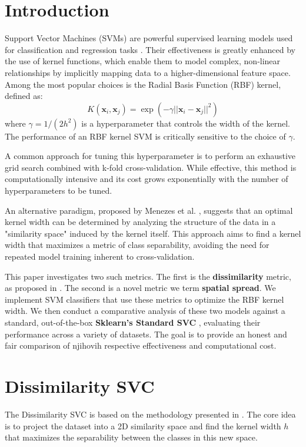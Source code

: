 \documentclass[conference]{IEEEtran}
\begin{document}
\section{Introduction}

Support Vector Machines (SVMs) are powerful supervised learning models used for classification and regression tasks \cite{b6}. Their effectiveness is greatly enhanced by the use of kernel functions, which enable them to model complex, non-linear relationships by implicitly mapping data to a higher-dimensional feature space. Among the most popular choices is the Radial Basis Function (RBF) kernel, defined as:
\begin{equation}
    K(\mathbf{x}_i, \mathbf{x}_j) = \exp(-\gamma ||\mathbf{x}_i - \mathbf{x}_j||^2)
\end{equation}
where $\gamma = 1 / (2h^2)$ is a hyperparameter that controls the width of the kernel. The performance of an RBF kernel SVM is critically sensitive to the choice of $\gamma$.

A common approach for tuning this hyperparameter is to perform an exhaustive grid search combined with k-fold cross-validation. While effective, this method is computationally intensive and its cost grows exponentially with the number of hyperparameters to be tuned.

An alternative paradigm, proposed by Menezes et al. \cite{b1}, suggests that an optimal kernel width can be determined by analyzing the structure of the data in a "similarity space" induced by the kernel itself. This approach aims to find a kernel width that maximizes a metric of class separability, avoiding the need for repeated model training inherent to cross-validation.

This paper investigates two such metrics. The first is the \textbf{dissimilarity} metric, as proposed in \cite{b1}. The second is a novel metric we term \textbf{spatial spread}. We implement SVM classifiers that use these metrics to optimize the RBF kernel width. We then conduct a comparative analysis of these two models against a standard, out-of-the-box \textbf{Sklearn's Standard SVC} \cite{b2}, evaluating their performance across a variety of datasets. The goal is to provide an honest and fair comparison of njihovih respective effectiveness and computational cost.

\section{Dissimilarity SVC}
The Dissimilarity SVC is based on the methodology presented in \cite{b1}. The core idea is to project the dataset into a 2D similarity space and find the kernel width $h$ that maximizes the separability between the classes in this new space.
\end{document}

